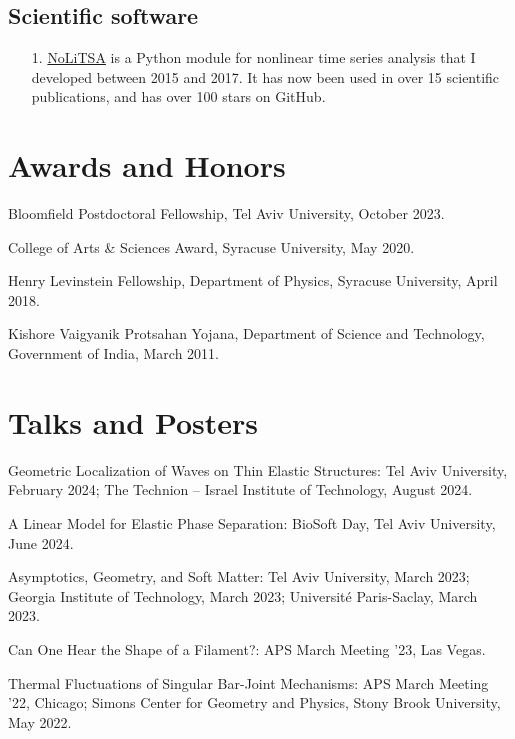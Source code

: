 \documentclass[10pt,a4paper,article,oneside]{memoir}
\begin{document}
\subsection{Scientific software}

\begin{enumerate}
  \item[1.] \href{https://github.com/manu-mannattil/NoLiTSA}{NoLiTSA} is a Python module for nonlinear time series analysis that I developed between 2015 and 2017.  It has now been used in over 15 scientific publications, and has over 100 stars on GitHub.
\end{enumerate}


\section{Awards and Honors}

Bloomfield Postdoctoral Fellowship, Tel Aviv University, October 2023.

College of Arts \& Sciences Award, Syracuse University, May 2020.

Henry Levinstein Fellowship, Department of Physics, Syracuse University, April 2018.

Kishore Vaigyanik Protsahan Yojana, Department of Science and Technology, Government of India, March 2011.


\section{Talks and Posters}

Geometric Localization of Waves on Thin Elastic Structures: Tel Aviv University, February 2024; The Technion -- Israel Institute of Technology, August 2024.

A Linear Model for Elastic Phase Separation: BioSoft Day, Tel Aviv University, June 2024.

Asymptotics, Geometry, and Soft Matter: Tel Aviv University, March 2023; Georgia Institute of Technology, March 2023; Universit\'{e} Paris-Saclay, March 2023.

Can One Hear the Shape of a Filament?: APS March Meeting '23, Las Vegas.

Thermal Fluctuations of Singular Bar-Joint Mechanisms: APS March Meeting '22, Chicago; Simons Center for Geometry and Physics, Stony Brook University, May 2022.
\end{document}
